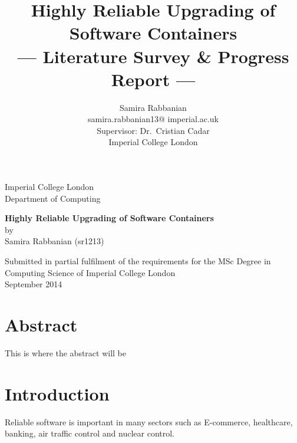 \documentclass[a4paper,11pt,twoside]{article}
\title{Highly Reliable Upgrading of Software Containers\\\Large{--- Literature Survey \& Progress Report ---}}
\author{Samira Rabbanian\\
  samira.rabbanian13@ imperial.ac.uk \\
  \small{Supervisor: Dr.\ Cristian Cadar}\\
  \small{Imperial College London}}
\newcommand\blankpage{%
\null
\thispagestyle{empty}%
\addtocounter{page}{-1}%
\newpage}
\begin{document}
\maketitle

\begin{titlepage}
    \begin{center}
        \vspace*{2cm}
        
        \large
        {Imperial College London}\\
        \large
         \vspace*{0.2cm}
        {Department of Computing}
        
        \vspace{4.5 cm}
        \large
        {\Large \textbf{Highly Reliable Upgrading of Software Containers}}\\
        \vspace{1.0 cm}
        {by}\\
        {Samira Rabbanian (sr1213)}
        
        \vspace{10cm}
        

  	\large {Submitted in partial fulfilment of the requirements for the MSc Degree in Computing Science of Imperial College London }\\
  	
\vspace*{1 cm}  	
  \large{September 2014}\\ 
           
    \end{center}
\end{titlepage}
\afterpage{\blankpage}
\clearpage

\section*{Abstract}
This is where the abstract will be 
\clearpage


\tableofcontents
\clearpage

\listoffigures
\clearpage

\section{Introduction}
Reliable software is important in many sectors such as E-commerce, healthcare, banking, air traffic control and nuclear control.
\end{document}
